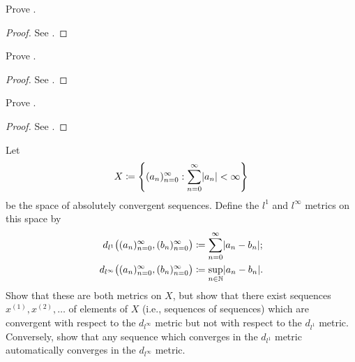 \begin{ex}\label{ii:ex:1.1.12}
  Prove .
\end{ex}

\begin{proof}
  See .
\end{proof}

\begin{ex}\label{ii:ex:1.1.13}
  Prove .
\end{ex}

\begin{proof}
  See .
\end{proof}

\begin{ex}\label{ii:ex:1.1.14}
  Prove .
\end{ex}

\begin{proof}
  See .
\end{proof}

\begin{ex}\label{ii:ex:1.1.15}
  Let
  \[
    X \coloneqq \set{(a_n)_{n = 0}^\infty : \sum_{n = 0}^\infty \abs{a_n} < \infty}
  \]
  be the space of absolutely convergent sequences. Define the \(l^1\) and \(l^\infty\) metrics
  on this space by
  \begin{align*}
    d_{l^1}\big((a_n)_{n = 0}^\infty, (b_n)_{n = 0}^\infty\big)      & \coloneqq \sum_{n = 0}^\infty \abs{a_n - b_n}; \\
    d_{l^\infty}\big((a_n)_{n = 0}^\infty, (b_n)_{n = 0}^\infty\big) & \coloneqq \sup_{n \in \N} \abs{a_n - b_n}.
  \end{align*}
  Show that these are both metrics on \(X\), but show that there exist sequences \(x^{(1)}, x^{(2)}, \dots\) of elements of \(X\) (i.e., sequences of sequences) which are convergent with respect to the \(d_{l^\infty}\) metric but not with respect to the \(d_{l^1}\) metric.
  Conversely, show that any sequence which converges in the \(d_{l^1}\) metric automatically converges in the \(d_{l^\infty}\) metric.
\end{ex}

